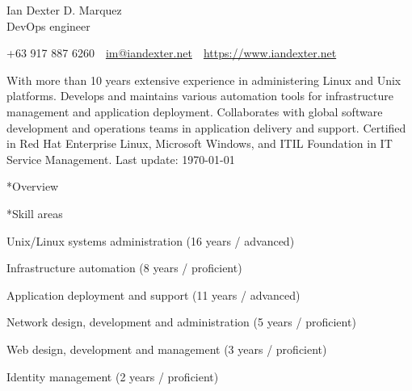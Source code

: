 \documentclass[10pt, a4paper, final]{article}
\begin{document}
\begin{center}
  \Huge Ian Dexter D. Marquez\\
  \Large DevOps engineer
\end{center}

\begin{center}\begin{spacing}{1}\small
  +63 917 887 6260~\textbullet~\href{mailto:im@iandexter.net}{im@iandexter.net}~\textbullet~\href{https://www.iandexter.net}{https://www.iandexter.net}\\
\end{spacing}\end{center}
\vspace{1.5em}

\normalsize With more than 10 years extensive experience in administering Linux and Unix platforms. Develops and maintains various automation tools for infrastructure management and application deployment. Collaborates with global software development and operations teams in application delivery and support. Certified in Red Hat Enterprise Linux, Microsoft Windows, and ITIL Foundation in IT Service Management. \small \textcolor{dark-gray}{Last update: \textsc{\today}} \normalsize

\vspace{1em}

\begin{section}*{Overview}
  \begin{subsection}*{Skill areas}
    \begin{compactitem}
      \item Unix/Linux systems administration (16 years / advanced) 
      \item Infrastructure automation (8 years / proficient) 
      \item Application deployment and support (11 years / advanced) 
      \item Network design, development and administration (5 years / proficient) 
      \item Web design, development and management (3 years / proficient) 
      \item Identity management (2 years / proficient) 
    \end{compactitem}
  \end{subsection}
\end{section}

\vspace{1em}
\end{document}
